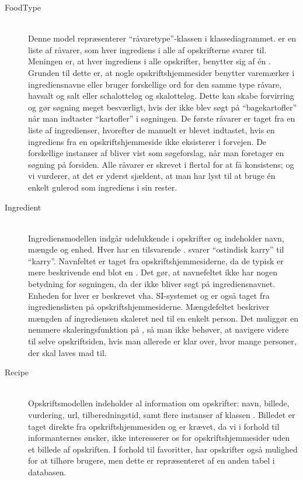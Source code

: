 \begin{description}

  \item[FoodType] \hfill \\
    Denne model repræsenterer ``råvaretype''-klassen i klassediagrammet.  er en liste af råvarer, som hver ingrediens i alle af opskrifterne svarer til. Meningen er, at hver ingrediens i alle opskrifter, benytter sig af én . Grunden til dette er, at nogle opskriftshjemmesider benytter varemærker i ingrediensnavne eller bruger forskellige ord for den samme type råvare, \fx havsalt og salt eller schalotteløg og skalotteløg. Dette kan skabe forvirring og gør søgning meget besværligt, hvis der ikke blev søgt på ``bagekartofler'' når man indtaster ``kartofler'' i søgningen. De første råvarer er taget fra en liste af ingredienser\cite{ingrediensliste}, hvorefter de manuelt er blevet indtastet, hvis en ingrediens fra en opskriftshjemmeside ikke eksisterer i forvejen. De forskellige instanser af  bliver \fx vist som søgeforslag, når man foretager en søgning på forsiden. Alle råvarer er skrevet i flertal for at få konsistens; og vi vurderer, at det er yderst sjældent, at man har lyst til \fx at bruge én enkelt gulerod som ingrediens i sin rester.

  \item[Ingredient] \hfill \\
    Ingrediensmodellen indgår udelukkende i opskrifter og indeholder navn, mængde og enhed. Hver  har en tilsvarende . \Fx svarer ``ostindisk karry'' til ``karry''. Navnfeltet er taget fra opskriftshjemmesiderne, da de typisk er mere beskrivende end blot en . Det gør, at navnefeltet ikke har nogen betydning for søgningen, da der ikke bliver søgt på ingrediensnavnet. Enheden for hver  er beskrevet vha. SI-systemet og er også taget fra ingredienslisten på opskriftshjemmesiderne. Mængdefeltet beskriver mængden af ingrediensen skaleret ned til en enkelt person. Det muliggør en nemmere skaleringsfunktion på \Foodl{}, så man ikke behøver, at navigere videre til selve opskriftsiden, hvis man allerede er klar over, hvor mange personer, der skal laves mad til.

  \item[Recipe] \hfill \\
    Opskriftsmodellen indeholder al information om opskrifter: navn, billede, vurdering, url, tilberedningstid, samt flere instanser af klassen . Billedet er taget direkte fra opskriftshjemmesiden og er krævet, da vi i forhold til informanternes ønsker, ikke interesserer os for opskriftshjemmesider uden et billede af opskriften. I forhold til favoritter, har opskrifter også mulighed for at tilhøre brugere, men dette er repræsenteret af en anden tabel i databasen.  


\end{description}
